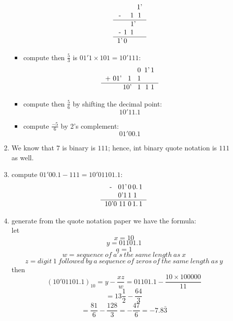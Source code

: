 \documentclass[11pt,twoside]{article}
\begin{document}
\begin{enumerate}[leftmargin=0pt]
\begin{enumerate}
\begin{itemize}[label = {}]
		\[\begin{tabular}{c@{\,}c@{\,}c@{\,}c}
  				&  &  & 1' \\
			-       &  & 1 & 1 \\
				\hline
  				&  &\  1' &  \\
			-       &  1  & 1 &  \\
				\hline
				1' &   0  &  &  \\
		\end{tabular}\]
	\item compute then $\frac{5}{3}$ is $01'1 \times 101 = 10'111$:
			\[\begin{tabular}{c@{\,}c@{\,}c@{\,}c@{\,}c}
  				&&  0&  \ 1'& 1 \\
			+     01' &1& 1 &  &  \\
				\hline
  				&10'\ \ \ &  1&\   1& 1 \\
			\end{tabular}\]
	\item compute then $\frac{5}{6}$ by shifting the decimal point:
					\[10'11.1\]
	\item compute $\frac{-5}{6}$ by 2's complement:
					\[01'00.1\]
	
	\end{itemize}
\item We know that $7$ is binary is $111$; hence, int binary quote notation is $111$ as well.
\item compute $01'00.1 -111 = 10'0 1101. 1$:
			\[\begin{tabular}{c@{\,}c@{\,}c@{\,}c@{\,}c}
		            -    &01'&  0& 0.& 1 \\
		            	& 0'1 &  1&1&  \\
				\hline
  				10'0 & 11 &  0&1.&  1\\
			\end{tabular}\]
\item generate from the quote notation paper we have the formula: \\ 
		 let
		 \[x = 10\]
		 \[y = 01101.1\]
		 \[a = 1\]
		 \[w = sequence \ of \ a's \ the \ same \ length\ as\  x\]
		 \[z = digit \ 1\  followed\ by \ a \ sequence \ of\ zeros\ of\ the\ same\ length\ as\ y\]
		then
		\[(10'0 1101. 1)_{10} =y- \frac{xz}{w} = 01101.1 - \frac{10 \times 1 00000}{11}\]
		\[ = 13\frac{1}{2} - \frac{64}{3}\]
		\[ = \frac{81}{6} - \frac{128}{3} = -\frac{47}{6} = -7.8\bar3\]
\end{enumerate}


\end{enumerate}
\end{document}
